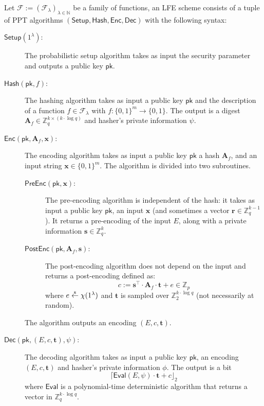 \documentclass{article}
\newcommand{\getsr}{\overset{\raisebox{-1pt}{$\scriptscriptstyle \$$}}{\gets}}
\newcommand{\sample}{\getsr}
\newcommand{\Pre}{\mathsf{Pre}}
\newcommand{\Post}{\mathsf{Post}}
\newcommand{\N}{\mathbb{N}}
\newcommand{\Z}{\mathbb{Z}}
\renewcommand{\sec}{\ensuremath{\lambda}}
\newcommand{\algofont}[1]{\ensuremath{\mathsf{#1}}}
\newcommand{\Enc}{{\algofont{Enc}}}
\newcommand{\Dec}{{\algofont{Dec}}}
\newcommand{\Setup}{{\algofont{Setup}}}
\newcommand{\Eval}{\algofont{Eval}\xspace}
\newcommand{\Hash}{{\algofont{Hash}}}
\newcommand{\pk}{{\mathsf{pk}}}
\newcommand\bbbone{1}
\begin{document}
\begin{definition}\label{def:LFE}
Let $\mathcal{F}:=(\mathcal{F}_\sec)_{\sec\in\N}$ be a family of functions, an LFE scheme consists of a tuple of PPT algorithms $(\Setup, \Hash, \Enc, \Dec)$ with the following syntax:
\begin{description}
    \item[$\Setup(\bbbone^\sec)$:] The probabilistic setup algorithm takes as input the security parameter and outputs a public key $\pk$.
    \item[$\Hash(\pk, f)$:] The hashing algorithm takes as input a public key $\pk$ and the description of a function $f\in\mathcal{F}_\sec$ with $f: \{0,1\}^{m} \to \{0,1\}$.
    The output is a digest $\mathbf{A}_f\in\Z_q^{k\times (k\cdot \log q)}$ and hasher's private information $\psi$.
    \item[$\Enc(\pk,\mathbf{A}_f, \mathbf{x})$:] The encoding algorithm takes as input a public key $\pk$ a hash $\mathbf{A}_f$, and an input string $\mathbf{x}\in\{0,1\}^m$. The algorithm is divided into two subroutines.
    \begin{description}
    \item[$\Pre\Enc(\pk, \mathbf{x})$:] The pre-encoding algorithm is independent of the hash: it takes as input a public key $\pk$, an input $\mathbf{x}$ (and sometimes a vector $\mathbf{r}\in\Z_q^{k-1}$). It returns a pre-encoding of the input $E$, along with a private information $\mathbf{s}\in\Z_q^{k}$. 
    \item[$\Post\Enc(\pk, \mathbf{A}_f, \mathbf{s})$:] The post-encoding algorithm does not depend on the input and returns a post-encoding defined as:
    \[
    c := \mathbf{s}^\intercal \cdot \mathbf{A}_f\cdot \mathbf{t} + e \in \Z_p
    \]
    where $e \sample \chi(\bbbone^\sec)$ and $\mathbf{t}$ is sampled over $\Z_2^{k\cdot \log q}$ (not necessarily at random).

    \end{description}
    The algorithm outputs an encoding $(E, c, \mathbf{t})$.
    
    \item[$\Dec(\pk, (E, c, \mathbf{t}), \psi)$:] The decoding algorithm takes as input a public key $\pk$, an encoding $(E, c, \mathbf{t})$ and hasher's private information $\phi$. The output is a bit 
    \[
    \lceil\Eval(E, \psi) \cdot \mathbf{t}+c\rfloor_2
    \]
    where $\Eval$ is a polynomial-time deterministic algorithm that returns a vector in $\Z_q^{k\cdot \log q}$.
\end{description}
\end{definition}
\end{document}
